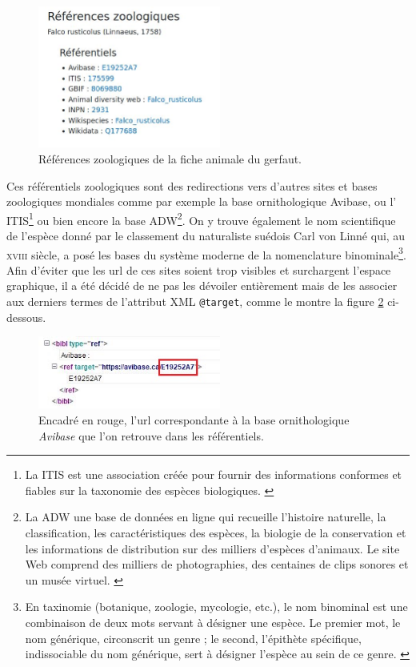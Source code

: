 \documentclass[a4paper,12pt,twoside]{book}
\begin{document}
\begin{figure}[H]
    \centering
    \includegraphics[width=6cm]{img/partie_3/ref_zoo.JPG}
    \caption{Références zoologiques de la fiche animale du gerfaut.}
    \label{ref_zoo}
\end{figure}

Ces référentiels zoologiques sont des redirections vers d'autres sites et bases zoologiques mondiales comme par exemple la base ornithologique Avibase, ou l' \acrfull{ITIS}\footnote{La ITIS est une association créée pour fournir des informations conformes et fiables sur la taxonomie des espèces biologiques. \cite{taxonomie}} ou bien encore la base \acrfull{ADW}\footnote{La ADW une base de données en ligne qui recueille l'histoire naturelle, la classification, les caractéristiques des espèces, la biologie de la conservation et les informations de distribution sur des milliers d'espèces d'animaux. Le site Web comprend des milliers de photographies, des centaines de clips sonores et un musée virtuel. \cite{adw}}. On y trouve également le nom scientifique de l'espèce donné par le classement du naturaliste suédois Carl von Linné qui, au \textsc{xviii}\ieme{} siècle, a posé les bases du système moderne de la nomenclature binominale\footnote{En taxinomie (botanique, zoologie, mycologie, etc.), le nom binominal est une combinaison de deux mots servant à désigner une espèce. Le premier mot, le nom générique, circonscrit un genre ; le second, l'épithète spécifique, indissociable du nom générique, sert à désigner l'espèce au sein de ce genre. \cite{binomial}}. Afin d'éviter que les url de ces sites soient trop visibles et surchargent l'espace graphique, il a été décidé de ne pas les dévoiler entièrement mais de les associer aux derniers termes de l'attribut XML \texttt{@target}, comme le montre la figure \ref{url} ci-dessous.

\begin{figure}[H]
    \centering
    \includegraphics[width=6cm]{img/partie_3/zoo_xml.JPG}
    \caption{Encadré en rouge, l'url correspondante à la base ornithologique \textit{Avibase} que l'on retrouve dans les référentiels.
    }
    \label{url}
\end{figure}
\end{document}
